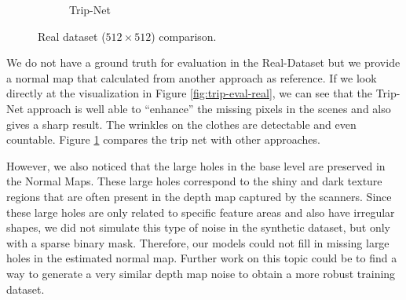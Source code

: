 \begin{figure}[H]
\begin{subfigure}[b]{0.24\linewidth}
		\caption{Trip-Net}
	\end{subfigure}	
	\decoRule
	\caption{Real dataset ($ 512\times 512 $) comparison.}
	\label{fig:real_eval_compare}
\end{figure}


We do not have a ground truth for evaluation in the Real-Dataset but we provide a normal map that calculated from another approach as reference. If we look directly at the visualization in Figure \ref{fig:trip-eval-real}, we can see that the Trip-Net approach is well able to ``enhance'' the missing pixels in the scenes and also gives a sharp result. The wrinkles on the clothes are detectable and even countable. Figure \ref{fig:real_eval_compare} compares the trip net with other approaches.


However, we also noticed that the large holes in the base level are preserved in the Normal Maps. These large holes correspond to the shiny and dark texture regions that are often present in the depth map captured by the scanners. Since these large holes are only related to specific feature areas and also have irregular shapes, we did not simulate this type of noise in the synthetic dataset, but only with a sparse binary mask. Therefore, our models could not fill in missing large holes in the estimated normal map. Further work on this topic could be to find a way to generate a very similar depth map noise to obtain a more robust training dataset. 

